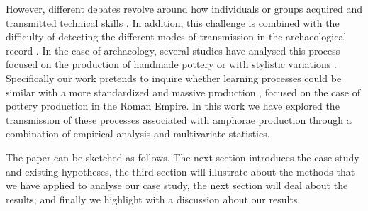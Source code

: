 \documentclass[review]{elsarticle}
\begin{document}

However, different debates revolve around how individuals or groups acquired and transmitted technical skills \citep{bowser_learning_2008, mesoudi_cultural_2008}. In addition, this challenge is combined with the difficulty of detecting the different modes of transmission in the archaeological record \citep{roux_standardization_2015}. In the case of archaeology, several studies have analysed this process focused on the production of handmade pottery \citep{steele_james_ceramic_2010} or with stylistic variations \citep{neiman_stylistic_1995, shennan_ceramic_2001}.
Specifically our work pretends to inquire whether learning processes could be similar with a more standardized and massive production \citep{gandon_copying_2014}, focused on the case of pottery production in the Roman Empire. In this work we have explored the transmission of these processes associated with amphorae production through a combination of empirical analysis and multivariate statistics.
                     
The paper can be sketched as follows. The next section introduces the case study and existing hypotheses, the third section will illustrate about the methods that we have applied to analyse our case study, the next section will deal about the results; and finally we highlight with a discussion about our results.  
\end{document}
